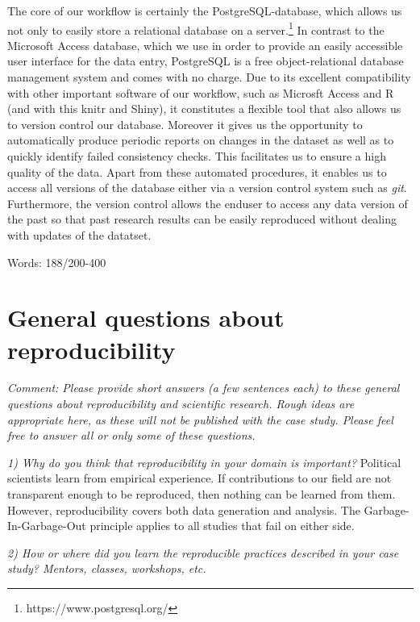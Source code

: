 \documentclass[
  11pt
]{article}
\begin{document}
\vspace*{1cm}

\noindent
The core of our workflow is certainly the PostgreSQL-database, which allows us not only to easily store a relational database on a server.\footnote{https://www.postgresql.org/} In contrast to the Microsoft Access database, which we use in order to provide an easily accessible user interface for the data entry, PostgreSQL is a free object-relational database management system and comes with no charge. Due to its excellent compatibility with other important software of our workflow, such as Microsft Access and R (and with this knitr and Shiny), it constitutes a flexible tool that also allows us to version control our database. Moreover it gives us the opportunity to automatically produce periodic reports on changes in the dataset as well as to quickly identify failed consistency checks. This facilitates us to ensure a high  quality of the data. Apart from these automated procedures, it enables us to access all versions of the database either via a version control system such as \textit{git}. Furthermore, the version control allows the enduser to access any data version of the past so that past research results can be easily reproduced without dealing with updates of the datatset.

\vspace*{1cm}
\noindent
Words:  188/200-400

\section{General questions about reproducibility}

\textit{Comment: Please provide short answers (a few sentences each) to these general questions about reproducibility and scientific research. Rough ideas are appropriate here, as these will not be published with the case study. Please feel free to answer all or only some of these questions.}

\noindent
\textit{1) Why do you think that reproducibility in your domain is important?}
Political scientists learn from empirical experience. If
contributions to our field are not transparent enough to be
reproduced, then nothing can be learned from them. However, 
reproducibility covers both data generation and analysis.
The Garbage-In-Garbage-Out principle applies to all studies
that fail on either side.  

\textit{2) How or where did you learn the reproducible practices described in your case study? Mentors, classes, workshops, etc.}
\end{document}
